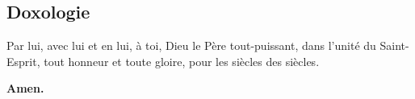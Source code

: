 \subsection*{Doxologie}


Par lui, avec lui et en lui, à toi, Dieu le Père tout-puissant, dans
l'unité du Saint-Esprit, tout honneur et toute gloire, pour les
siècles des siècles.

{\bf Amen.}

